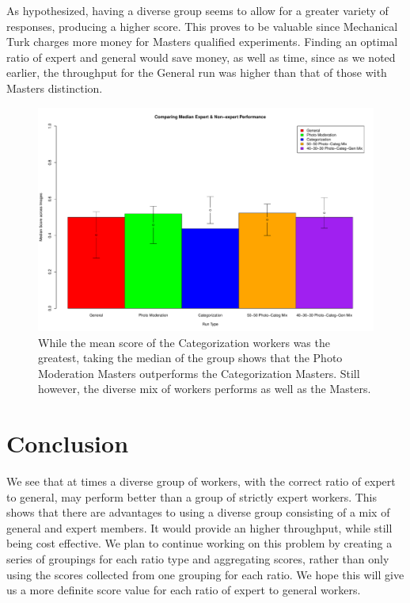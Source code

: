 \documentclass{chi2012}
\newcommand{\tab}{\hspace*{2em}}
\begin{document}
\tab As hypothesized, having a diverse group seems to allow for a greater variety of responses, producing a higher score. This proves to be valuable since Mechanical Turk charges more money for Masters qualified experiments. Finding an optimal ratio of expert and general would save money, as well as time, since as we noted earlier, the throughput for the General run was higher than that of those with Masters distinction.

 \begin{figure}
\centering
\includegraphics[width=0.9\columnwidth]{medianScores}
\caption{While the mean score of the Categorization workers was the greatest, taking the median of the group shows that the Photo Moderation Masters outperforms the Categorization Masters. Still however, the diverse mix of workers performs as well as the Masters.}
\label{fig:figure1}
\end{figure} 

\section{Conclusion}

\tab We see that at times a diverse group of workers, with the correct ratio of expert to general, may perform better than a group of strictly expert workers. This shows that there are advantages to using a diverse group consisting of a mix of general and expert members. It would provide an higher throughput, while still being cost effective. We plan to continue working on this problem by creating a series of groupings for each ratio type and aggregating scores, rather than only using the scores collected from one grouping for each ratio. We hope this will give us a more definite score value for each ratio of expert to general workers. 

\balancecolumns %



\end{document}
